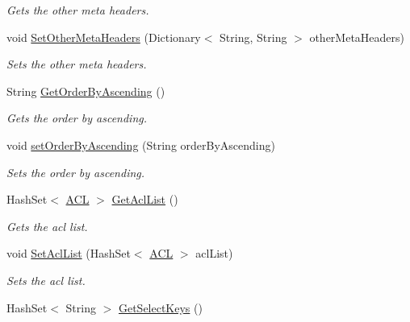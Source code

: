 \begin{DoxyCompactItemize}
\begin{DoxyCompactList}\small\item\em Gets the other meta headers. \end{DoxyCompactList}\item 
void \hyperlink{classcom_1_1shephertz_1_1app42_1_1paas_1_1sdk_1_1csharp_1_1_app42_service_a3134d96a8b0bc2a542b4c6eb4158b5dd}{Set\+Other\+Meta\+Headers} (Dictionary$<$ String, String $>$ other\+Meta\+Headers)
\begin{DoxyCompactList}\small\item\em Sets the other meta headers. \end{DoxyCompactList}\item 
String \hyperlink{classcom_1_1shephertz_1_1app42_1_1paas_1_1sdk_1_1csharp_1_1_app42_service_ad5d1023f1364c0a1bfdea3c7235f08ed}{Get\+Order\+By\+Ascending} ()
\begin{DoxyCompactList}\small\item\em Gets the order by ascending. \end{DoxyCompactList}\item 
void \hyperlink{classcom_1_1shephertz_1_1app42_1_1paas_1_1sdk_1_1csharp_1_1_app42_service_a74cd327fbaaa5eac44cecef70b608136}{set\+Order\+By\+Ascending} (String order\+By\+Ascending)
\begin{DoxyCompactList}\small\item\em Sets the order by ascending. \end{DoxyCompactList}\item 
Hash\+Set$<$ \hyperlink{classcom_1_1shephertz_1_1app42_1_1paas_1_1sdk_1_1csharp_1_1_a_c_l}{A\+C\+L} $>$ \hyperlink{classcom_1_1shephertz_1_1app42_1_1paas_1_1sdk_1_1csharp_1_1_app42_service_ab67457faa934dfd8e99e4b1f73b4a14d}{Get\+Acl\+List} ()
\begin{DoxyCompactList}\small\item\em Gets the acl list. \end{DoxyCompactList}\item 
void \hyperlink{classcom_1_1shephertz_1_1app42_1_1paas_1_1sdk_1_1csharp_1_1_app42_service_acfb7cb30e561136745473704d207dcce}{Set\+Acl\+List} (Hash\+Set$<$ \hyperlink{classcom_1_1shephertz_1_1app42_1_1paas_1_1sdk_1_1csharp_1_1_a_c_l}{A\+C\+L} $>$ acl\+List)
\begin{DoxyCompactList}\small\item\em Sets the acl list. \end{DoxyCompactList}\item 
Hash\+Set$<$ String $>$ \hyperlink{classcom_1_1shephertz_1_1app42_1_1paas_1_1sdk_1_1csharp_1_1_app42_service_ad92be4a83b4921e83a09d7a720b04ced}{Get\+Select\+Keys} ()

\end{DoxyCompactItemize}

